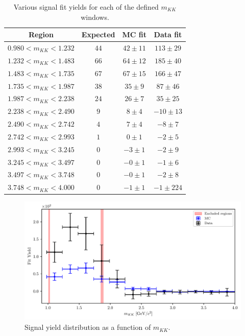 \begin{table}[H]
	\centering
	\begin{tabular}{c|c|c|c}
		Region & Expected & MC fit & Data fit \\
		\toprule
		$0.980  < m_{KK} < 1.232$ & $44$ & $42 \pm 11$ & $113 \pm 29$ \\
		$1.232  < m_{KK} < 1.483$ & $66$ & $64 \pm 12$ & $185 \pm 40$ \\
		$1.483  < m_{KK} < 1.735$ & $67$ & $67 \pm 15$ & $166 \pm 47$ \\
		$1.735  < m_{KK} < 1.987$ & $38$ & $35 \pm 9$ & $87 \pm 46$ \\
		$1.987  < m_{KK} < 2.238$ & $24$ & $26 \pm 7$ & $35 \pm 25$ \\
		$2.238  < m_{KK} < 2.490$ & $9$ & $8 \pm 4$ & $-10 \pm 13$ \\
		$2.490  < m_{KK} < 2.742$ & $4$ & $7 \pm 4$ & $-8 \pm 7$ \\
		$2.742  < m_{KK} < 2.993$ & $1$ & $0 \pm 1$ & $-2 \pm 5$ \\
		$2.993  < m_{KK} < 3.245$ & $0$ & $-3 \pm 1$ & $-2 \pm 9$ \\
		$3.245  < m_{KK} < 3.497$ & $0$ & $-0 \pm 1$ & $-1 \pm 6$ \\
		$3.497  < m_{KK} < 3.748$ & $0$ & $-0 \pm 1$ & $-2 \pm 8$ \\
		$3.748  < m_{KK} < 4.000$ & $0$ & $-1 \pm 1$ & $-1 \pm 224$ \\
		\bottomrule
	\end{tabular}
	\captionsetup{width=.8\linewidth}
	\caption{Various signal fit yields for each of the defined $m_{KK}$ windows.}
	\label{tab:mKK_windows}
\end{table}

\begin{figure}[H]
	\centering
	\captionsetup{width=0.8\linewidth}
	\includegraphics[width=\linewidth]{fig/sig_mKK_all}
	\caption{Signal yield distribution as a function of $m_{KK}$.}
	\label{fig:mKK_windows}
\end{figure} 


